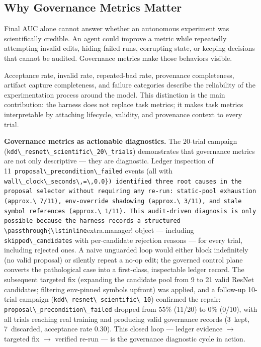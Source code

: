 \subsection{Why Governance Metrics Matter}\label{why-governance-metrics-matter}

Final AUC alone cannot answer whether an autonomous experiment was scientifically credible. An agent could improve a metric while repeatedly attempting invalid edits, hiding failed runs, corrupting state, or keeping decisions that cannot be audited. Governance metrics make those behaviors visible.

Acceptance rate, invalid rate, repeated-bad rate, provenance completeness, artifact capture completeness, and failure categories describe the reliability of the experimentation process around the model. This distinction is the main contribution: the harness does not replace task metrics; it makes task metrics interpretable by attaching lifecycle, validity, and provenance context to every trial.

\textbf{Governance metrics as actionable diagnostics.} The 20-trial campaign (\passthrough{\lstinline!kdd\_resnet\_scientific\_20\_trials!}) demonstrates that governance metrics are not only descriptive --- they are diagnostic. Ledger inspection of 11~\passthrough{\lstinline!proposal\_precondition\_failed!} events (all with \passthrough{\lstinline!wall\_clock\_seconds\,=\,0.0}) identified three root causes in the proposal selector without requiring any re-run: static-pool exhaustion (approx.\ 7/11), env-override shadowing (approx.\ 3/11), and stale symbol references (approx.\ 1/11). This audit-driven diagnosis is only possible because the harness records a structured \passthrough{\lstinline!extra.manager!} object --- including \passthrough{\lstinline!skipped\_candidates!} with per-candidate rejection reasons --- for every trial, including rejected ones. A naive unguarded loop would either block indefinitely (no valid proposal) or silently repeat a no-op edit; the governed control plane converts the pathological case into a first-class, inspectable ledger record. The subsequent targeted fix (expanding the candidate pool from 9 to 21 valid ResNet candidates; filtering env-pinned symbols upfront) was applied, and a follow-up 10-trial campaign (\passthrough{\lstinline!kdd\_resnet\_scientific\_10!}) confirmed the repair: \passthrough{\lstinline!proposal\_precondition\_failed!} dropped from 55\% (11/20) to 0\% (0/10), with all trials reaching real training and producing valid governance records (3~kept, 7~discarded, acceptance rate 0.30). This closed loop --- ledger evidence $\to$ targeted fix $\to$ verified re-run --- is the governance diagnostic cycle in action.

